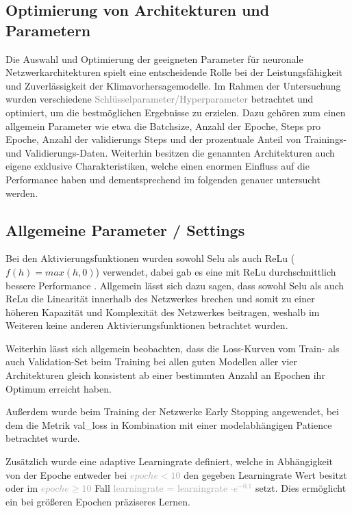 \documentclass[manuscript,screen,review]{acmart}
\begin{document}
\subsection{Optimierung von Architekturen und Parametern}
Die Auswahl und Optimierung der geeigneten Parameter für neuronale Netzwerkarchitekturen spielt eine entscheidende Rolle bei der Leistungsfähigkeit und Zuverlässigkeit der Klimavorhersagemodelle. 
Im Rahmen der Untersuchung wurden verschiedene \textcolor{gray}{Schlüsselparameter/Hyperparameter} betrachtet und optimiert, um die bestmöglichen Ergebnisse zu erzielen.
Dazu gehören zum einen allgemein Parameter wie etwa die Batchsize, Anzahl der Epoche, Steps pro Epoche, Anzahl der validierungs Steps und der prozentuale Anteil von Trainings- und Validierungs-Daten.
Weiterhin besitzen die genannten Architekturen auch eigene exklusive Charakteristiken, welche einen enormen Einfluss auf die Performance haben und dementsprechend im folgenden genauer untersucht werden.
\subsection{Allgemeine Parameter / Settings}
Bei den Aktivierungsfunktionen wurden sowohl Selu  als auch ReLu ($f(h)=max(h,0)$) verwendet, dabei gab es eine mit ReLu durchschnittlich bessere Performance . Allgemein lässt sich dazu sagen, dass sowohl Selu als auch ReLu die Linearität innerhalb des Netzwerkes brechen und somit zu einer höheren Kapazität und Komplexität des Netzwerkes beitragen, weshalb im Weiteren keine anderen Aktivierungsfunktionen betrachtet wurden.

Weiterhin lässt sich allgemein beobachten, dass die Loss-Kurven vom Train- als auch Validation-Set beim Training bei allen guten Modellen aller vier Architekturen gleich konsistent ab einer bestimmten Anzahl an Epochen ihr Optimum erreicht haben.


Außerdem wurde beim Training der Netzwerke Early Stopping angewendet, bei dem die Metrik val\_loss in Kombination mit einer modelabhängigen Patience betrachtet wurde. 

Zusätzlich wurde eine adaptive Learningrate definiert, welche in Abhängigkeit von der Epoche entweder bei \textcolor{darkgray}{$epoche < 10$} den gegeben Learningrate Wert besitzt oder im \textcolor{darkgray}{$epoche \geq 10$} Fall \textcolor{darkgray}{learningrate = learningrate $\cdot e^{-0.1}$} setzt. Dies ermöglicht ein bei größeren Epochen präziseres Lernen.
\end{document}
